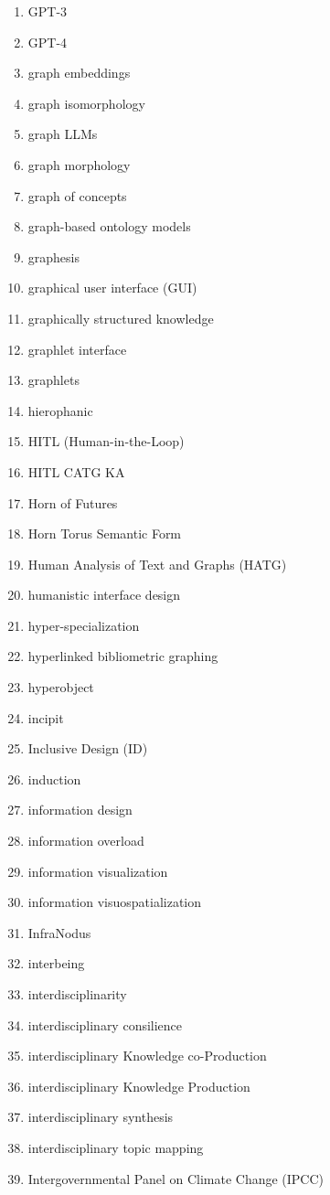 \begin{multicols}{4}
\begin{enumerate}[label=\arabic*.]
\item GPT-3
\item GPT-4
\item graph embeddings
\item graph isomorphology
\item graph LLMs
\item graph morphology
\item graph of concepts
\item graph-based ontology models
\item graphesis
\item graphical user interface (GUI)
\item graphically structured knowledge
\item graphlet interface
\item graphlets
\item hierophanic
\item HITL (Human-in-the-Loop)
\item HITL CATG KA
\item Horn of Futures
\item Horn Torus Semantic Form
\item Human Analysis of Text and Graphs (HATG)
\item humanistic interface design
\item hyper-specialization
\item hyperlinked bibliometric graphing
\item hyperobject
\item incipit
\item Inclusive Design (ID)
\item induction
\item information design
\item information overload
\item information visualization
\item information visuospatialization
\item InfraNodus
\item interbeing
\item interdisciplinarity
\item interdisciplinary consilience
\item interdisciplinary Knowledge co-Production
\item interdisciplinary Knowledge Production
\item interdisciplinary synthesis
\item interdisciplinary topic mapping
\item Intergovernmental Panel on Climate Change (IPCC)

\end{enumerate}
\end{multicols}
